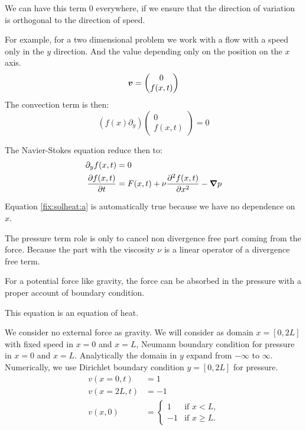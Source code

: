 We can have this term 0 everywhere, if we ensure that the direction of variation is orthogonal to the direction of speed.

For example, for a two dimensional problem we work with a flow with a speed only in the $y$ direction. And the value depending only on the position on the $x$ axis.
\begin{equation}
	{\boldsymbol {v}}=\begin{pmatrix}
	         	0\\f(x,t)
	         \end{pmatrix}
\end{equation}
The convection term is then:
\begin{equation}
	(f(x)\partial_{y})\begin{pmatrix}
	         	0\\f(x,t)
	         \end{pmatrix}=0
\end{equation}

The Navier-Stokes equation reduce then to:
\begin{align}
\label{fix:solheat:a}
	\partial_{y}f(x,t)&=0\\
	\frac{\partial f(x,t)}{\partial t}&=F(x,t)+\nu\frac{\partial^2 f(x,t)}{\partial x^2}-{\boldsymbol {\nabla}}p
\end{align}

Equation \ref{fix:solheat:a} is automatically true because we have no dependence on $x$.

The pressure term role is only to cancel non divergence free part coming from the force. Because the part with the viscosity $\nu$ is a linear operator
of a divergence free term.

For a potential force like gravity, the force can be absorbed in the pressure with a proper account of boundary condition.

This equation is an equation of heat.

We consider no external force as gravity.
We will consider as domain $x=[0,2L]$ with fixed speed in $x=0$ and $x=L$,  Neumann boundary condition for pressure in $x=0$ and $x=L$.
Analytically the domain in $y$ expand from $-\infty$ to $\infty$. Numerically, we use Dirichlet boundary condition $y=[0,2L]$ for pressure.
\begin{align*}
    v(x=0,t)&=1\\
    v(x=2L,t)&=-1\\
    v(x,0)&=\begin{cases}
             1&\text{if $x<L$,}\\
             -1& \text{if $x\geq L$.}
            \end{cases}
\end{align*}

